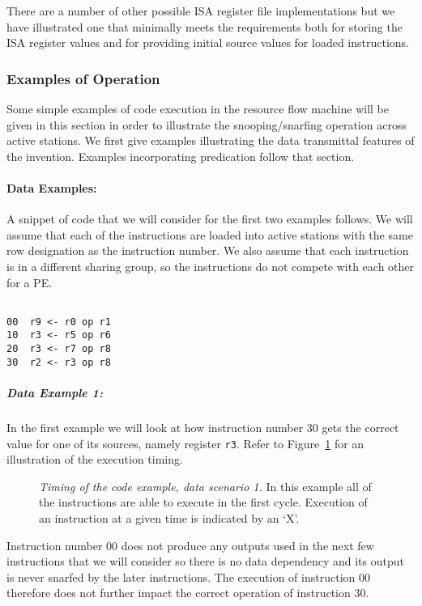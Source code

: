 \documentclass[10pt,dvips]{article}
\begin{document}
There are a number of other possible ISA register file implementations
but we have illustrated one that minimally meets the requirements
both for storing the ISA register values and for providing initial source
values for loaded instructions.

\subsubsection{Examples of Operation}
Some simple examples of code execution in the resource flow machine
will be 
given in this section in order to illustrate the snooping/snarfing
operation across active stations. We first give examples illustrating
the data transmittal features of the invention. Examples incorporating
predication follow that section.

\paragraph{Data Examples: }
A snippet of code that we will consider for the first two examples
follows. We will assume that each of the
instructions are loaded into active stations with the same row designation
as the instruction number. We also assume that each instruction is in
a different sharing group, so the instructions do not compete with
each other for a PE.

\begin{verbatim}

00	r9 <- r0 op r1
10	r3 <- r5 op r6
20	r3 <- r7 op r8
30	r2 <- r3 op r8

\end{verbatim}

\subparagraph{Data Example 1: }
In the first example we will look at how instruction number 30 gets the
correct value for one of its sources, namely register
{\tt r3}. Refer to Figure~\ref{ex1} for an illustration of the execution
timing.

\begin{figure}
\centering
{}
\caption{{\em Timing of the code example, data scenario 1.}
In this example all of the instructions are able to execute in
the first cycle. Execution of an instruction at a given time is
indicated by an `X'.}
\label{ex1}
\end{figure}

Instruction number 00 does not produce
any outputs used in the next few instructions that
we will consider so there is no data dependency and its output 
is never snarfed by the later instructions.
The execution of instruction 00 therefore
does not further impact the correct operation of instruction 30.
\end{document}
